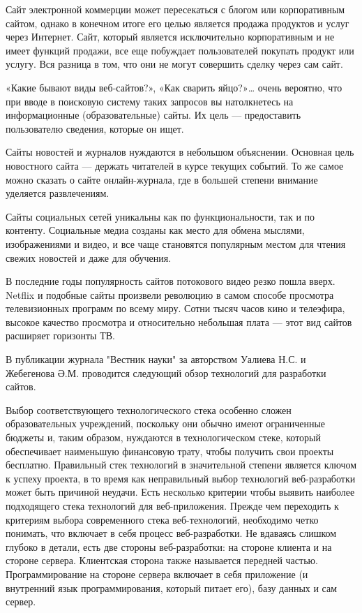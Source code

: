 Сайт электронной коммерции может пересекаться с блогом или корпоративным сайтом, однако в конечном итоге его целью является продажа продуктов и услуг через Интернет.
Сайт, который является исключительно корпоративным и не имеет функций продажи, все еще побуждает пользователей покупать продукт или услугу.
Вся разница в том, что они не могут совершить сделку через сам сайт.

«Какие бывают виды веб-сайтов?», «Как сварить яйцо?»… очень вероятно, что при вводе в поисковую систему таких запросов вы натолкнетесь на информационные (образовательные) сайты.
Их цель — предоставить пользователю сведения, которые он ищет.

Сайты новостей и журналов нуждаются в небольшом объяснении.
Основная цель новостного сайта — держать читателей в курсе текущих событий.
То же самое можно сказать о сайте онлайн-журнала, где в большей степени внимание уделяется развлечениям.

Сайты социальных сетей уникальны как по функциональности, так и по контенту.
Социальные медиа созданы как место для обмена мыслями, изображениями и видео, и все чаще становятся популярным местом для чтения свежих новостей и даже для обучения.

В последние годы популярность сайтов потокового видео резко пошла вверх.
Netflix и подобные сайты произвели революцию в самом способе просмотра телевизионных программ по всему миру.
Сотни тысяч часов кино и телеэфира, высокое качество просмотра и относительно небольшая плата — этот вид сайтов расширяет горизонты ТВ.


В публикации журнала "Вестник науки" за авторством Уалиева Н.С. и Жебегенова Ә.М. \cite{ualiev-jebegenov-issledovanie} проводится следующий обзор технологий для разработки сайтов.

Выбор соответствующего технологического стека особенно сложен образовательных учреждений, поскольку они обычно имеют ограниченные бюджеты и, таким образом, нуждаются в технологическом стеке, который обеспечивает наименьшую финансовую трату, чтобы получить свои проекты бесплатно.
Правильный стек технологий в значительной степени является ключом к успеху проекта, в то время как неправильный выбор технологий веб-разработки может быть причиной неудачи.
Есть несколько критерии чтобы выявить наиболее подходящего стека технологий для веб-приложения.
Прежде чем переходить к критериям выбора современного стека веб-технологий, необходимо четко понимать, что включает в себя процесс веб-разработки.
Не вдаваясь слишком глубоко в детали, есть две стороны веб-разработки: на стороне клиента и на стороне сервера.
Клиентская сторона также называется передней частью.
Программирование на стороне сервера включает в себя приложение (и внутренний язык программирования, который питает его), базу данных и сам сервер.

